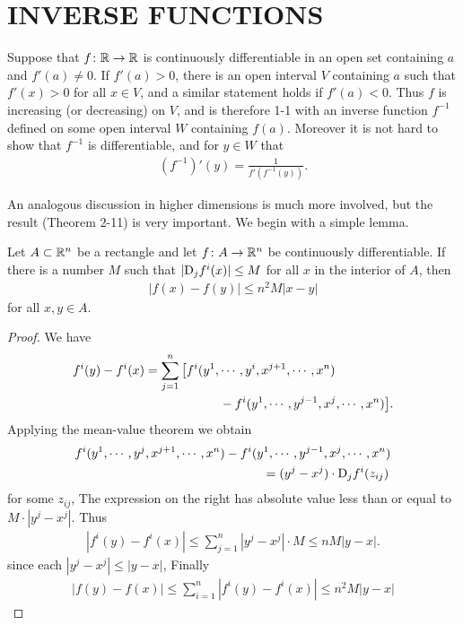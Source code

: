 \clearpage
\section[\textsc{inverse functions}]{INVERSE FUNCTIONS} 
Suppose that $f\colon{}\mathbb{R}\to \mathbb{R}$ is continuously differentiable in an open set containing
$a$ and $f'(a)\neq 0$. If $f'(a)>0$, there is an open interval $V$ containing $a$ such that 
$f'(x)>0$ for all $x\in V$, and a similar statement holds if $f'(a)<0$. Thus $f$ is increasing
(or decreasing) on $V$, and is therefore 1-1 with an inverse function $f^{-1}$ defined on some 
open interval $W$ containing $f(a)$. Moreover it is not hard to show that $f^{-1}$ is differentiable,
and for $y\in W$ that 
\begin{align*}
    (f^{-1})'(y) = \frac{1}{f'(f^{-1}(y))}.
\end{align*}

An analogous discussion in higher dimensions is much more
involved, but the result (Theorem 2-11) is very important.
We begin with a simple lemma.

\begin{lemma}
    Let $A\subset \mathbb{R}^n$ be a rectangle and let $f\colon{}A\to \mathbb{R}^n$ be continuously differentiable.
    If there is a number $M$ such that $|\mathrm{D}_jf^i(x)| \le M$ for all $x$ in the interior of $A$, then 
    \begin{align*}
        \left|f(x) - f(y)\right| \le n^2M\left|x-y\right|
    \end{align*}
    for all $x, y\in A$.
\end{lemma}

\begin{proof}
    We have 
    \begin{align*}
        f^i(y) - f^i(x)
        &  = \sum_{j=1}^{n}\big[ f^i(y^1, \cdots, y^i, x^{j+1}, \cdots, x^n)\\
        &  \hspace*{6em} - f^i(y^1, \cdots, y^{j-1}, x^j, \cdots, x^n)\big].
    \end{align*}
    Applying the mean-value theorem we obtain 
    \begin{align*}
        f^i(y^1, \cdots, y^j, x^{j+1}, \cdots, x^n) 
        & - f^i(y^1, \cdots, y^{j-1}, x^j, \cdots, x^n)\\
        & \hspace*{3em} = (y^j-x^j) \cdot \mathrm{D}_jf^i(z_{ij})
    \end{align*}
    for some $z_{ij}$, The expression on the right has absolute value less than or equal to $M\cdot |y^j-x^j|$. 
    Thus 
    \begin{align*}
        \left|f^i(y) - f^i(x)\right| 
        \le \sum_{j=1}^{n}{|y^j-x^j|\cdot M} 
        \le nM|y-x|.
    \end{align*}
    since each $|y^j - x^j| \le |y-x|$, Finally
    \begin{align*}
        |f(y) - f(x)| 
        \le \sum_{i=1}^{n}{|f^i(y) - f^i(x)|}
        \le n^2M|y-x| 
    \end{align*}
\end{proof}

